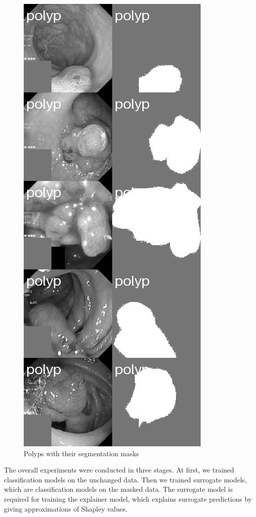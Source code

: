 \documentclass[magisterska,en]{pracamgr}
\begin{document}
\begin{figure}[H]
\centering
\includegraphics[scale=0.5]{./images/polyps_segmentation.png}
\caption{Polyps with their segmentation masks}
\label{polyps_segmentation}
\end{figure}



The overall experiments were conducted in three stages. At first, we trained classification models on the unchanged data. Then we trained surrogate models, which are classification models on the masked data. The surrogate model is required for training the explainer model, which explains surrogate predictions by giving approximations of Shapley values.
\end{document}
